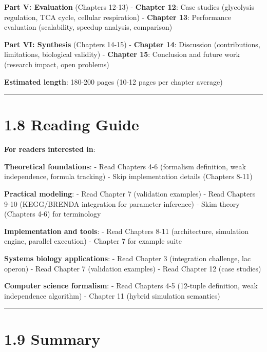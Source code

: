 \textbf{Part V: Evaluation} (Chapters 12-13) - \textbf{Chapter 12}: Case
studies (glycolysis regulation, TCA cycle, cellular respiration) -
\textbf{Chapter 13}: Performance evaluation (scalability, speedup
analysis, comparison)

\textbf{Part VI: Synthesis} (Chapters 14-15) - \textbf{Chapter 14}:
Discussion (contributions, limitations, biological validity) -
\textbf{Chapter 15}: Conclusion and future work (research impact, open
problems)

\textbf{Estimated length}: 180-200 pages (10-12 pages per chapter
average)

\begin{center}\rule{0.5\linewidth}{0.5pt}\end{center}

\hypertarget{reading-guide}{%
\section{1.8 Reading Guide}\label{reading-guide}}

\textbf{For readers interested in}:

\textbf{Theoretical foundations}: - Read Chapters 4-6 (formalism
definition, weak independence, formula tracking) - Skip implementation
details (Chapters 8-11)

\textbf{Practical modeling}: - Read Chapter 7 (validation examples) -
Read Chapters 9-10 (KEGG/BRENDA integration for parameter inference) -
Skim theory (Chapters 4-6) for terminology

\textbf{Implementation and tools}: - Read Chapters 8-11 (architecture,
simulation engine, parallel execution) - Chapter 7 for example suite

\textbf{Systems biology applications}: - Read Chapter 3 (integration
challenge, lac operon) - Read Chapter 7 (validation examples) - Read
Chapter 12 (case studies)

\textbf{Computer science formalism}: - Read Chapters 4-5 (12-tuple
definition, weak independence algorithm) - Chapter 11 (hybrid simulation
semantics)

\begin{center}\rule{0.5\linewidth}{0.5pt}\end{center}

\hypertarget{summary}{%
\section{1.9 Summary}\label{summary}}

